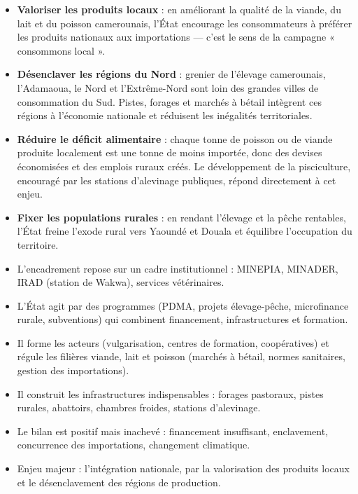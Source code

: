 \documentclass[11pt]{article}
\newcommand{\cle}[1]{{\popxbold\color{popdark}#1}}
\begin{document}
\begin{itemize}
\item \textbf{Valoriser les produits locaux} : en améliorant la qualité de la viande, du lait et du poisson camerounais, l'État encourage les consommateurs à préférer les produits nationaux aux importations — c'est le sens de la campagne « consommons local ».
\item \textbf{Désenclaver les régions du Nord} : grenier de l'élevage camerounais, l'Adamaoua, le Nord et l'Extrême-Nord sont loin des grandes villes de consommation du Sud. Pistes, forages et marchés à bétail intègrent ces régions à l'économie nationale et réduisent les inégalités territoriales.
\item \textbf{Réduire le déficit alimentaire} : chaque tonne de poisson ou de viande produite localement est une tonne de moins importée, donc des devises économisées et des emplois ruraux créés. Le développement de la pisciculture, encouragé par les stations d'alevinage publiques, répond directement à cet enjeu.
\item \textbf{Fixer les populations rurales} : en rendant l'élevage et la pêche rentables, l'État freine l'exode rural vers Yaoundé et Douala et équilibre l'occupation du territoire.
\end{itemize}

\begin{aretenir}
\begin{itemize}
\item L'encadrement repose sur un \cle{cadre institutionnel} : MINEPIA, MINADER, IRAD (station de Wakwa), services vétérinaires.
\item L'État agit par des \cle{programmes} (PDMA, projets élevage-pêche, microfinance rurale, subventions) qui combinent financement, infrastructures et formation.
\item Il \cle{forme} les acteurs (vulgarisation, centres de formation, coopératives) et \cle{régule} les filières viande, lait et poisson (marchés à bétail, normes sanitaires, gestion des importations).
\item Il construit les \cle{infrastructures} indispensables : forages pastoraux, pistes rurales, abattoirs, chambres froides, stations d'alevinage.
\item Le bilan est positif mais inachevé : financement insuffisant, enclavement, concurrence des importations, changement climatique.
\item Enjeu majeur : l'\cle{intégration nationale}, par la valorisation des produits locaux et le désenclavement des régions de production.
\end{itemize}
\end{aretenir}
\end{document}
